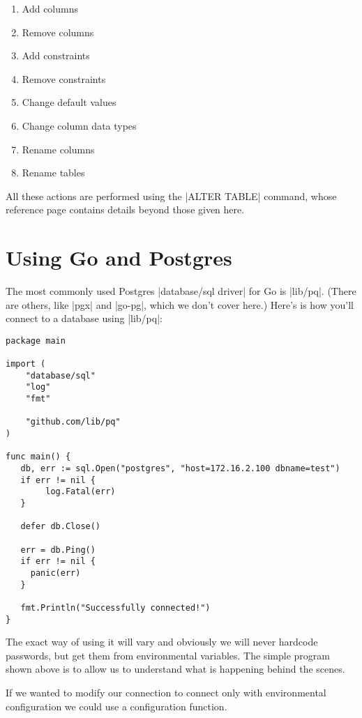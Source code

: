 \begin{enumerate}
\item Add columns
\item Remove columns
\item Add constraints
\item Remove constraints
\item Change default values
\item Change column data types
\item Rename columns
\item Rename tables
\end{enumerate}

All these actions are performed using the |ALTER TABLE| command, whose reference page contains details beyond those given here.


\chapter{Using Go and Postgres}


The most commonly used Postgres |database/sql driver| for Go is |lib/pq|. (There are others, like |pgx| and |go-pg|, which we don’t cover here.) Here’s is how you’ll connect to a database using |lib/pq|:


\begin{verbatim}
package main

import (
    "database/sql"
    "log"
    "fmt"

    "github.com/lib/pq"
)

func main() {
   db, err := sql.Open("postgres", "host=172.16.2.100 dbname=test")
   if err != nil {
        log.Fatal(err)
   }

   defer db.Close()

   err = db.Ping()
   if err != nil {
     panic(err)
   }

   fmt.Println("Successfully connected!")
}
\end{verbatim}


The exact way of using it will vary and obviously we will never hardcode passwords, but get them from environmental variables. The simple program shown above is to allow us to understand what is happening behind the scenes.

If we wanted to modify our connection to connect only with environmental configuration we could use a configuration function.


